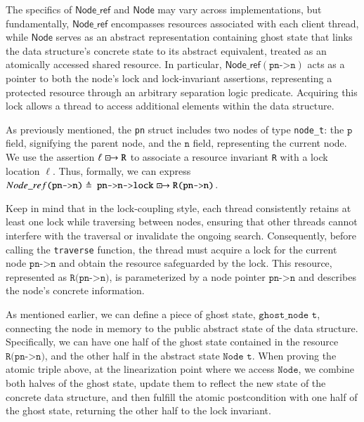 \documentclass[a4paper,UKenglish,cleveref, autoref, thm-restate]{lipics-v2021}
\newcommand{\islock}{\boxdotright}
\newcommand{\lockvar}{\islock}
\newcommand{\treerep}{\ensuremath{\mathsf{Node}}}
\newcommand{\nodeboxrep}{\ensuremath{\mathsf{Node\_ref}}}
\begin{document}
The specifics of $\nodeboxrep$ and $\treerep$ may vary across implementations, but fundamentally, $\nodeboxrep$ encompasses resources associated with each client thread, while $\treerep$ serves as an abstract representation containing ghost state that links the data structure's concrete state to its abstract equivalent, treated as an atomically accessed shared resource. In particular, $\nodeboxrep(\texttt{pn->n})$ acts as a pointer to both the node's lock and lock-invariant assertions, representing a protected resource through an arbitrary separation logic predicate. Acquiring this lock allows a thread to access additional elements within the data structure.

As previously mentioned, the \lstinline{pn} struct includes two nodes of type \lstinline{node_t}: the $\texttt{p}$ field, signifying the parent node, and the $\texttt{n}$ field, representing the current node. We use the assertion $\ell \lockvar \texttt{R}$ to associate a resource invariant \texttt{R} with a lock location $\ell$. Thus, formally, we can express $\nodeboxrep \texttt{(pn->n)} \triangleq\ \texttt{pn->n->lock} \lockvar \texttt{R(pn->n)}$.

Keep in mind that in the lock-coupling style, each thread consistently retains at least one lock while traversing between nodes, ensuring that other threads cannot interfere with the traversal or invalidate the ongoing search. Consequently, before calling the \texttt{traverse} function, the thread must acquire a lock for the current node $\texttt{pn->n}$ and obtain the resource safeguarded by the lock. This resource, represented as $\texttt{R(pn->n)}$, is parameterized by a node pointer $\texttt{pn->n}$ and describes the node's concrete information.

As mentioned earlier, we can define a piece of ghost state, $\texttt{ghost\_node t}$, connecting the node in memory to the public abstract state of the data structure. Specifically, we can have one half of the ghost state contained in the resource $\texttt{R(pn->n)}$, and the other half in the abstract state $\texttt{Node t}$. When proving the atomic triple above, at the linearization point where we access $\texttt{Node}$, we combine both halves of the ghost state, update them to reflect the new state of the concrete data structure, and then fulfill the atomic postcondition with one half of the ghost state, returning the other half to the lock invariant.
\end{document}
